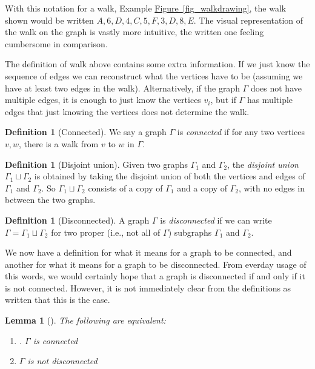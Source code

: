 \documentclass[10pt,]{book}
\theoremstyle{plain}
\newtheorem{lemma}[theorem]{Lemma}
\theoremstyle{definition}
\newtheorem{definition}[theorem]{Definition}
\theoremstyle{definition}
\theoremstyle{definition}
\theoremstyle{definition}
\numberwithin{equation}{section}
\begin{document}
\hypertarget{p-92}{}%
With this notation for a walk, Example \hyperref[fig_walkdrawing]{Figure~\ref{fig_walkdrawing}}, the walk shown would be written \(A, 6, D, 4, C, 5, F, 3, D, 8, E\).  The visual representation of the walk on the graph is vastly more intuitive, the written one feeling cumbersome in comparison.%
\par
\hypertarget{p-93}{}%
The definition of walk above contains some extra information.  If we just know the sequence of edges we can reconstruct what the vertices have to be (assuming we have at least two edges in the walk).  Alternatively, if the graph \(\Gamma\) does not have multiple edges, it is enough to just know the vertices \(v_i\), but if \(\Gamma\) has multiple edges that just knowing the vertices does not determine the walk.%
\begin{definition}[{Connected}]\label{definition-11}
\hypertarget{p-94}{}%
We say a graph \(\Gamma\) is \emph{connected} if for any two vertices \(v,w\), there is a walk from \(v\) to \(w\) in \(\Gamma\).%
\end{definition}
\begin{definition}[{Disjoint union}]\label{definition-12}
\hypertarget{p-95}{}%
Given two graphs \(\Gamma_1\) and \(\Gamma_2\), the \emph{disjoint union} \(\Gamma_1\sqcup \Gamma_2\) is obtained by taking the disjoint union of both the vertices and edges of \(\Gamma_1\) and \(\Gamma_2\).  So \(\Gamma_1\sqcup\Gamma_2\) consists of a copy of \(\Gamma_1\) and a copy of \(\Gamma_2\), with no edges in between the two graphs.%
\end{definition}
\begin{definition}[{Disconnected}]\label{definition-13}
\hypertarget{p-96}{}%
A graph \(\Gamma\) is \emph{disconnected} if we can write \(\Gamma=\Gamma_1\sqcup \Gamma_2\) for two proper (i.e., not all of \(\Gamma\)) subgraphs \(\Gamma_1\) and \(\Gamma_2\).%
\end{definition}
\hypertarget{p-97}{}%
We now have a definition for what it means for a graph to be connected, and another for what it means for a graph to be disconnected.  From everday usage of this words, we would certainly hope that a graph is disconnected if and only if it is not connected.  However, it is not immediately clear from the definitions as written that this is the case.%
\begin{lemma}[{}]\label{lemma-1}
\hypertarget{p-98}{}%
The following are equivalent:%
\leavevmode%
\begin{enumerate}
\item\hypertarget{li-24}{}. \(\Gamma\) is connected%
\item\hypertarget{li-25}{}\(\Gamma\) is not disconnected%
\end{enumerate}
\end{lemma}
\end{document}
